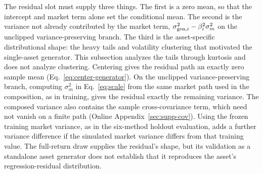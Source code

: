 The residual slot must supply three things. The first is a zero mean,
so that the intercept and market term alone set the conditional
mean. The second is the variance not already contributed by the
market term, $\sigma_{\mathrm{gen},i}^2 - \beta_i^2 \sigma_m^2$ on the
unclipped variance-preserving branch. The third is the asset-specific
distributional shape: the heavy tails and volatility clustering that
motivated the single-asset generator. This subsection analyzes the
tails through kurtosis and does not analyze clustering. Centering
gives the residual path an exactly zero sample mean
(Eq.~\eqref{eq:center-generator}). On the unclipped variance-preserving
branch, computing $\sigma_m^2$ in Eq.~\eqref{eq:scale} from the same
market path used in the composition, as in training, gives the
residual exactly the remaining variance. The composed variance also
contains the sample cross-covariance term, which need not vanish on a
finite path (Online Appendix~\ref{sec:supp-cov}). Using the frozen
training market variance, as in the six-method holdout evaluation,
adds a further variance difference if the simulated market variance
differs from that training value. The full-return draw supplies the
residual's shape, but its validation as a standalone asset generator
does not establish that it reproduces the asset's regression-residual
distribution.

